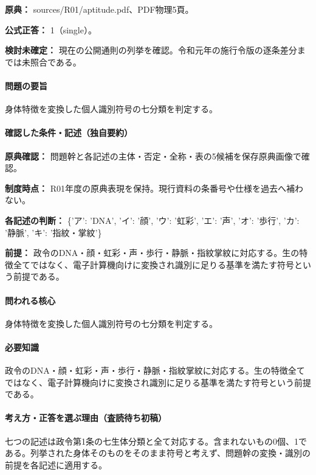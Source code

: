 \noindent\textbf{原典：} sources/R01/aptitude.pdf、PDF物理5頁。

\textbf{公式正答：} 1（single）。

\par\textbf{検討未確定：} 現在の公開通則の列挙を確認。令和元年の施行令版の逐条差分までは未照合である。

\paragraph{問題の要旨} 身体特徴を変換した個人識別符号の七分類を判定する。

\paragraph{確認した条件・記述（独自要約）}\mbox{}\par

\noindent\textbf{原典確認：} 問題幹と各記述の主体・否定・全称・表の5候補を保存原典画像で確認。\par

\noindent\textbf{制度時点：} R01年度の原典表現を保持。現行資料の条番号や仕様を過去へ補わない。\par

\noindent\textbf{各記述の判断：} \{'ア': 'DNA', 'イ': '顔', 'ウ': '虹彩', 'エ': '声', 'オ': '歩行', 'カ': '静脈', 'キ': '指紋・掌紋'\}\par

\noindent\textbf{前提：} 政令のDNA・顔・虹彩・声・歩行・静脈・指紋掌紋に対応する。生の特徴全てではなく、電子計算機向けに変換され識別に足りる基準を満たす符号という前提である。\par

\paragraph{問われる核心} 身体特徴を変換した個人識別符号の七分類を判定する。

\paragraph{必要知識} 政令のDNA・顔・虹彩・声・歩行・静脈・指紋掌紋に対応する。生の特徴全てではなく、電子計算機向けに変換され識別に足りる基準を満たす符号という前提である。

\paragraph{考え方・正答を選ぶ理由（査読待ち初稿）} 七つの記述は政令第1条の七生体分類と全て対応する。含まれないもの0個、1である。列挙された身体そのものをそのまま符号と考えず、問題幹の変換・識別の前提を各記述に適用する。

